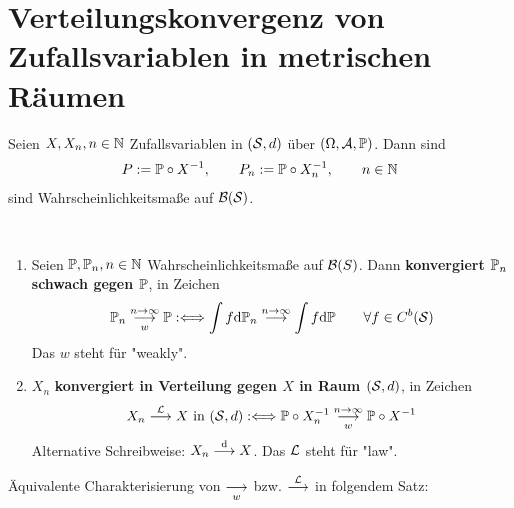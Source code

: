 
\section{Verteilungskonvergenz von Zufallsvariablen in metrischen Räumen} %
Seien $X,X_n,n\in\N$ Zufallsvariablen in $(\S,d)$ über $(\Omega,\A,\P)$. 
Dann sind
\begin{align*}
	P:=\P\circ X^{-1},\qquad P_n:=\P\circ X_n^{-1},\qquad n\in\N
\end{align*}
sind Wahrscheinlichkeitsmaße auf $\B(\S)$.

\begin{definition}[Verteilungskonvergenz]\label{def4.1}\
	\begin{enumerate}[label=(\arabic*)]
		\item Seien $\P,\P_n,n\in\N$ Wahrscheinlichkeitsmaße auf $\B(S)$. 
		Dann \textbf{konvergiert $\P_n$ schwach gegen $\P$}, in Zeichen
		\begin{align*}
			\P_n\stackrelnew{w}{n\to\infty}{\longrightarrow} \P
			:\Longleftrightarrow
			\int\limits f\d \P_n\stackrel{n\to\infty}{\longrightarrow}\int\limits f\d \P\qquad\forall f\in C^b(\S)
		\end{align*}
		Das $w$ steht für "weakly".
		\item $X_n$ \textbf{konvergiert in Verteilung gegen $X$ in Raum $(\S,d)$}, in Zeichen
		\begin{align*}
			X_n\stackrel{\mathcal{L}}{\longrightarrow} X\text{ in }(\S,d)
			:\Longleftrightarrow
			\P\circ X_n^{-1}\stackrelnew{w}{n\to\infty}{\longrightarrow}\P\circ X^{-1}
		\end{align*}
		Alternative Schreibweise: $X_n\stackrel{\d}{\longrightarrow} X$. Das $\L$ steht für "law".
	\end{enumerate}
\end{definition}

Äquivalente Charakterisierung von $\stackrelnew{w}{}{\longrightarrow}$ bzw. $\stackrel{\L}{\longrightarrow}$ in folgendem Satz:


